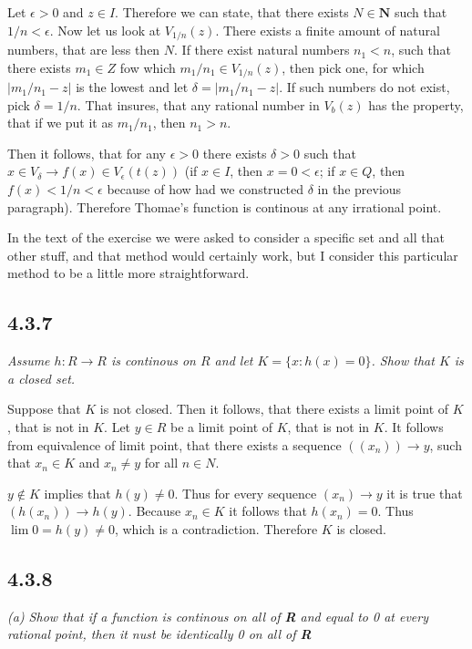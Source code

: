 \documentclass[11pt,oneside,titlepage]{book}
\begin{document}
Let $\epsilon > 0$ and $z \in I$. Therefore we can state, that there exists
$N \in \textbf{N}$ such that $1/n < \epsilon$. Now let us look at
$V_{1/n}(z)$. 
There exists a finite amount of natural numbers, that
are less then $N$. If there exist natural numbers $n_1 < n$, such
that there exists $m_1 \in Z$ fow which $m_1 / n_1 \in V_{1/n}(z)$, then pick
one, for which $|m_1 / n_1 - z|$ is the lowest and let $\delta
= |m_1 / n_1 - z|$.
If such numbers do not exist, pick $\delta = 1/n$.
That insures, that any rational number in $V_b(z)$ has the property,
that if we put it as $m_1/n_1$, then $n_1 > n$.

Then it follows, that for any  $\epsilon > 0$ there exists $\delta > 0$
such that $x \in V_\delta \to f(x) \in V_\epsilon(t(z))$ (if $x \in I$, then
$x = 0 < \epsilon$; if $x \in Q$, then $f(x) < 1/n < \epsilon$ because of
how had
we constructed $\delta$ in the previous paragraph). Therefore Thomae's function
is continous at any irrational point.

In the text of the exercise we were asked to consider a specific set and
all that other stuff,
and that method would certainly work, but I consider this particular method
to be a little more straightforward.

\subsection*{4.3.7}
\textit{Assume $h: R \to R$ is continous on $R$ and let $K = \{x: h(x) = 0\}$.
  Show that $K$ is a closed set.}

Suppose that $K$ is not closed. Then it follows, that there exists a
limit point of $K$, that is not in $K$. Let $y \in R$ be a limit point
of $K$, that is not in $K$. It follows from equivalence of limit point,
that there exists a sequence
$((x_n)) \to y$, such that $x_n \in K$ and $x_n \neq y$ for all
$n \in N$.

$y \not \in K$ implies that $h(y) \neq 0$. Thus
for every
sequence $(x_n) \to y$ it is true that  $(h(x_n)) \to h(y) $. Because
$x_n \in K$ it follows
that $h(x_n) = 0$. Thus $\lim 0 = h(y) \neq 0$, which
is a contradiction. Therefore $K$ is closed.

\subsection*{4.3.8}
\textit{(a) Show that if a function is continous on all of \textbf{R} and
  equal to 0 at every rational point, then it nust be identically 0 on all
  of \textbf{R}}
\end{document}
